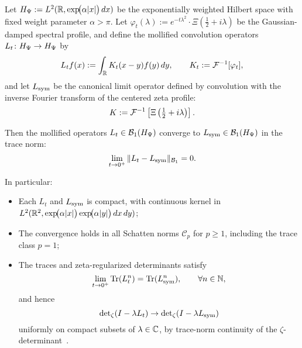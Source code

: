 \begin{lemma}
\label{lem:kernel_trace_norm_convergence}

Let \( H_{\Psi} := L^2(\mathbb{R}, \exp\!\bigl(\alpha |x|\bigr)\,dx) \) be the exponentially weighted Hilbert space with fixed weight parameter \( \alpha > \pi \). Let \( \varphi_t(\lambda) := e^{-t\lambda^2} \cdot \Xi\left( \tfrac{1}{2} + i\lambda \right) \) be the Gaussian-damped spectral profile, and define the mollified convolution operators \( L_t \colon H_{\Psi} \to H_{\Psi} \) by
\[
L_t f(x) := \int_{\mathbb{R}} K_t(x - y) f(y) \, dy, \qquad K_t := \mathcal{F}^{-1}[\varphi_t],
\]
and let \( L_{\mathrm{sym}} \) be the canonical limit operator defined by convolution with the inverse Fourier transform of the centered zeta profile:
\[
K := \mathcal{F}^{-1}\left[ \Xi\left(\tfrac{1}{2} + i\lambda \right) \right].
\]

\medskip
\noindent
Then the mollified operators \( L_t \in \mathcal{B}_1(H_{\Psi}) \) converge to \( L_{\mathrm{sym}} \in \mathcal{B}_1(H_{\Psi}) \) in the trace norm:
\[
\lim_{t \to 0^+} \| L_t - L_{\mathrm{sym}} \|_{\mathcal{B}_1} = 0.
\]

\medskip
\noindent
In particular:
\begin{itemize}
  \item Each \( L_t \) and \( L_{\mathrm{sym}} \) is compact, with continuous kernel in \( L^2(\mathbb{R}^2, \exp\!\bigl(\alpha |x|\bigr) \exp\!\bigl(\alpha |y|\bigr) \, dx \, dy) \);
  \item The convergence holds in all Schatten norms \( \mathcal{C}_p \) for \( p \ge 1 \), including the trace class \( p = 1 \);
  \item The traces and zeta-regularized determinants satisfy
  \[
  \lim_{t \to 0^+} \operatorname{Tr}(L_t^n) = \operatorname{Tr}(L_{\mathrm{sym}}^n), \qquad \forall n \in \mathbb{N},
  \]
  and hence
  \[
  \det\nolimits_\zeta(I - \lambda L_t) \to \det\nolimits_\zeta(I - \lambda L_{\mathrm{sym}})
  \]
  uniformly on compact subsets of \( \lambda \in \mathbb{C} \), by trace-norm continuity of the \(\zeta\)-determinant~\cite[Ch.~4]{Simon2005TraceIdeals}.
\end{itemize}
\end{lemma}
